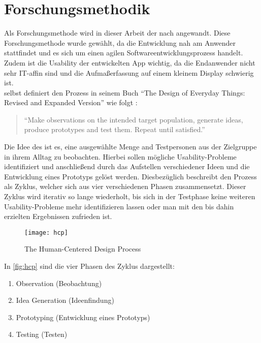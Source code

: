 \chapter{Forschungsmethodik}
Als Forschungsmethode wird in dieser Arbeit der \hcdp{} nach \citeauthor{Norman13} angewandt.
Diese Forschungsmethode wurde gewählt, da die Entwicklung nah am Anwender stattfindet und es sich um einen agilen Softwareentwicklungsprozess handelt.
Zudem ist die Usability der entwickelten App wichtig, da die Endanwender nicht sehr IT-affin sind und die Aufmaßerfassung auf einem kleinem Display schwierig ist. \\

\noindent
\citeauthor{Norman13} selbst definiert den Prozess in seinem Buch ``The Design of Everyday Things: Revised and Expanded Version'' wie folgt \citep[Abbildung 6.2]{Norman13}:

\begin{quote}
  ``Make observations on the intended target population, generate ideas, produce prototypes and test them.
  Repeat until satisfied.''
\end{quote}

\noindent
Die Idee des \hcdp{} ist es, eine ausgewählte Menge and Testpersonen aus der Zielgruppe in ihrem Alltag zu beobachten.
Hierbei sollen mögliche Usability-Probleme identifiziert und anschließend durch das Aufstellen verschiedener Ideen und die Entwicklung eines Prototyps gelöst werden.
Diesbezüglich beschreibt \citeauthor{Norman13} den Prozess als Zyklus, welcher sich aus vier verschiedenen Phasen zusammensetzt.
Dieser Zyklus wird iterativ so lange wiederholt, bis sich in der Testphase keine weiteren Usability-Probleme mehr identifizieren lassen oder man mit den bis dahin erzielten Ergebnissen zufrieden ist. \\

\begin{figure}[h]
  \centering
  \texttt{[image: hcp]}
  \caption{The Human-Centered Design Process}
  \label{fig:hcp}
\end{figure}

\noindent
In \autoref{fig:hcp} sind die vier Phasen des Zyklus dargestellt:
\begin{enumerate}
  \item Observation (Beobachtung) \label{itm:observation}
  \item Idea Generation (Ideenfindung) \label{itm:idea}
  \item Prototyping (Entwicklung eines Prototyps) \label{itm:prototyping}
  \item Testing (Testen) \label{itm:testing}
\end{enumerate}

